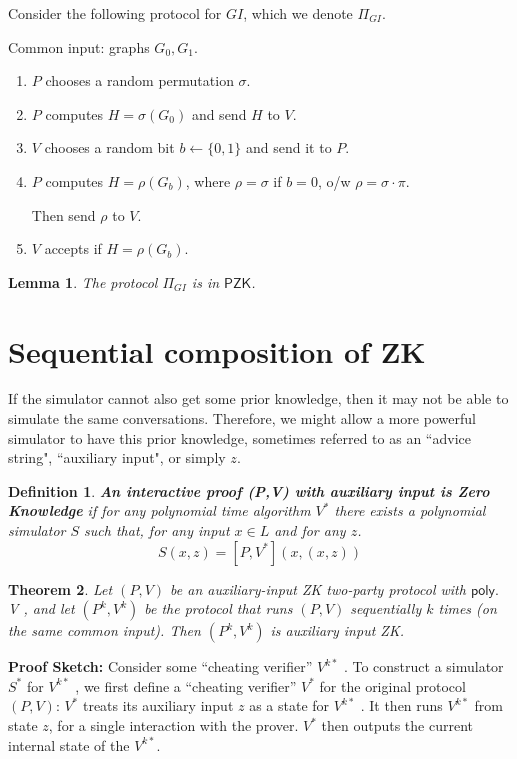 \documentclass[11pt]{article}
\newcommand{\class}[1]{{\ensuremath{\mathsf{#1}}}}
\newcommand{\pzk}{\class{PZK}}
\newcommand{\poly}{\class{poly}}
\newcommand{\zo}{\{0, 1\}}
\newtheorem{definition}{Definition}[section]
\newtheorem{theorem}{Theorem}[section]
\newtheorem{lemma}[theorem]{Lemma}
\begin{document}
Consider the following protocol for $GI$, which we denote $\Pi_{GI}$.

Common input: graphs $G_0, G_1$.
\begin{enumerate}
\item $P$ chooses a random permutation $\sigma$.
\item $P$ computes $H = \sigma(G_0)$ and send $H$ to $V$.
\item $V$ chooses a random bit $b \leftarrow \zo$ and send it to $P$.
\item $P$ computes $H = \rho(G_b)$, where $\rho = \sigma$ if $b=0$, o/w $\rho = \sigma \cdot \pi$.

Then send $\rho$ to $V$.
\item $V$ accepts if $H = \rho(G_b)$.
\end{enumerate}
\begin{lemma}
The  protocol $\Pi_{GI}$ is in 	$\pzk$.
\end{lemma}

\section{Sequential composition of ZK}
If the simulator cannot also get some prior knowledge, then it may not be able to simulate the same conversations. Therefore, we might allow a more powerful simulator to have this prior knowledge, sometimes referred to as an ``advice string", ``auxiliary input", or simply $z$.
\begin{definition} \textbf{An interactive proof (P,V) with auxiliary input is Zero Knowledge} if for any polynomial time algorithm $V^*$ there exists a polynomial simulator $S$ such that, for any input $x \in L$ and for any $z$.
$$S(x, z) = [P, V^*](x, (x, z)) $$
\end{definition}
\begin{theorem}
Let $(P, V)$ be an auxiliary-input ZK two-party protocol with $\poly.$ V , and let $(P^k , V^k)$ be the protocol that runs $(P, V)$ sequentially $k$ times (on the same common input). Then $(P^k , V^k )$ is auxiliary input ZK.
\end{theorem}

\textbf{Proof Sketch: }Consider some ``cheating verifier'' $V^{k*}$ . To construct a simulator $S^*$ for $V^{k*}$ , we first define a ``cheating verifier'' $V^*$ for the original protocol $(P, V )$: $V^*$ treats its auxiliary input $z$ as a state for $V^{k*}$ . It then runs $V^{k*}$ from state $z$, for a single interaction with the prover. $V^*$ then outputs the current internal state of the $V^{k*}$.
\end{document}
